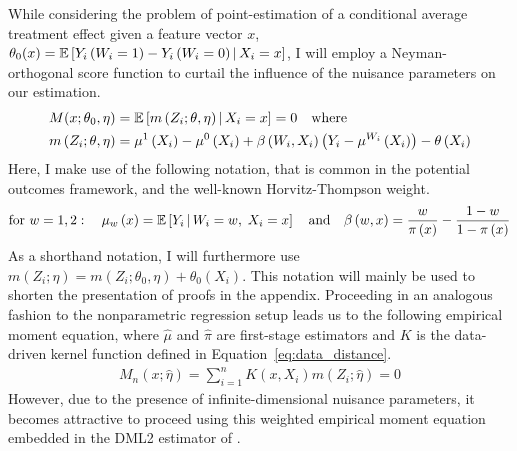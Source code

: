 While considering the problem of point-estimation of a conditional average
treatment effect given a feature vector $x$,
$\theta_{0}(x) = \mathbb{E}\left[Y_{i}\left(W_{i} = 1\right) -
		Y_{i}\left(W_{i} = 0\right) \, \middle| \, X_{i} = x\right]$, I
will employ a Neyman-orthogonal score function to curtail the influence of the
nuisance parameters on our estimation.
\begin{equation}
	\begin{aligned}
		M(x; \theta_{0}, \eta)
		 & = \mathbb{E}\left[m\left(Z_{i}; \theta, \eta\right) \, \middle| \, X_{i} = x\right]
		= 0
		\quad \text{where} \quad                                                                                                                                                                                       \\
		m\left(Z_{i}; \theta, \eta\right)
		 & = \mu^{1}\left(X_{i}\right) - \mu^{0}\left(X_{i}\right) + \beta\left(W_{i}, X_{i}\right)\left(Y_{i} - \mu^{W_{i}}\left(X_{i}\right)\right) - \theta\left(X_{i}\right)
	\end{aligned}
\end{equation}
Here, I make use of the following notation, that is common in the potential
outcomes framework, and the well-known Horvitz-Thompson weight.
\begin{equation}
	\text{for }  w = 1,2: \quad \mu_w\left(x\right) = \mathbb{E}\left[Y_{i} \, \middle| \, W_{i} = w, \; X_{i} = x\right]
	\quad \text{and} \quad
	\beta\left(w, x\right) = \frac{w}{\pi\left(x\right)} - \frac{1 - w}{1 - \pi\left(x\right)}
\end{equation}
As a shorthand notation, I will furthermore use $m\left(Z_{i}; \eta\right) = m\left(Z_{i}; \theta_{0}, \eta\right) + \theta_{0}\left(X_{i}\right)$.
This notation will mainly be used to shorten the presentation of proofs in the appendix.
Proceeding in an analogous fashion to the nonparametric regression setup leads us to the following empirical moment equation, where $\hat{\mu}$ and $\hat{\pi}$ are first-stage estimators and $K$ is the data-driven kernel function defined in Equation~\ref{eq:data_distance}.
\begin{equation}
	\begin{aligned}
		M_{n}\left(x; \hat{\eta}\right)
		= \sum_{i = 1}^{n} K(x, X_{i}) m\left(Z_{i}; \hat{\eta}\right)
		= 0
	\end{aligned}
\end{equation}
However, due to the presence of infinite-dimensional nuisance parameters, it becomes attractive to proceed using this weighted empirical moment equation embedded in the DML2 estimator of \citet{chernozhukov_doubledebiased_2018}.
